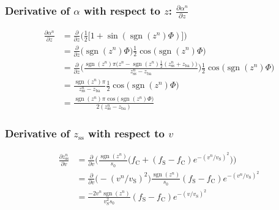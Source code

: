 \documentclass{article}
\DeclareMathOperator{\sgn}{sgn}
\begin{document}
\subsubsection*{Derivative of $\alpha$ with respect to $z$: $\frac{\partial \alpha^n}{\partial z}$}
\begin{equation}
    \begin{aligned}
    \frac{\partial \alpha^n}{\partial z} &= \frac{\partial}{\partial z} \Bigg(\frac{1}{2}\big[1+\sin(\sgn(z^n)\Phi)\big]\Bigg)\\
    &= \frac{\partial}{\partial z}\Big(\sgn(z^n)\Phi\Big)\frac{1}{2}\cos\big(\sgn(z^n)\Phi\big)\\
    &= \frac{\partial}{\partial z}\Bigg(\frac{\sgn(z^n)\pi\big(z^n-\sgn(z^n)\frac{1}{2}(z_\text{ss}^n+z_\text{ba})\big)}{z_\text{ss}^n-z_\text{ba}}\Bigg)\frac{1}{2}\cos\big(\sgn(z^n)\Phi\big)\\
    &= \frac{\sgn(z^n)\pi}{z_\text{ss}^n-z_\text{ba}}\frac{1}{2}\cos\big(\sgn(z^n)\Phi\big)\\
    &= \frac{\sgn(z^n)\pi\cos\big(\sgn(z^n)\Phi\big)}{2(z_\text{ss}^n-z_\text{ba})}
    \end{aligned}
\end{equation}
\subsubsection*{Derivative of $z_\text{ss}$ with respect to $v$}
\begin{equation}
\begin{aligned}
    \frac{\partial z_\text{ss}^n}{\partial v} &= \frac{\partial}{\partial v} \Bigg(\frac{\sgn(z^n)}{s_0}\Big(f_\text{C}+(f_\text{S}-f_\text{C})e^{-(v^n/v_\text{S})^2}\Big)\Bigg)\\
    &= \frac{\partial}{\partial v}\big(-(v^n/v_\text{S})^2\big)\frac{\sgn(z^n)}{s_0}(f_\text{S}-f_\text{C})e^{-(v^n/v_\text{S})^2}\\
    &= \frac{-2v^n\sgn(z^n)}{v_\text{S}^2s_0}(f_\text{S}-f_\text{C})e^{-(v/v_\text{S})^2}
    \end{aligned}
\end{equation}
\end{document}

